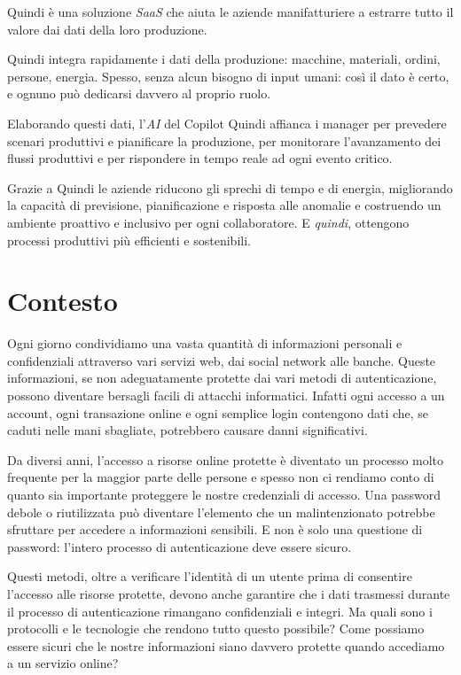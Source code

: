 Quindi è una soluzione \emph{\gls{SaaS}} che aiuta le aziende manifatturiere a estrarre tutto il valore dai dati della loro produzione.

Quindi integra rapidamente i dati della produzione: macchine, materiali, ordini, persone, energia. Spesso, senza alcun bisogno di input umani: così il dato è certo, e ognuno può dedicarsi davvero al proprio ruolo.

Elaborando questi dati, l'\emph{\gls{AI}} del Copilot Quindi affianca i manager per prevedere scenari produttivi e pianificare la produzione, per monitorare l’avanzamento dei flussi produttivi e per rispondere in tempo reale ad ogni evento critico.

Grazie a Quindi le aziende riducono gli sprechi di tempo e di energia, migliorando la capacità di previsione, pianificazione e risposta alle anomalie e costruendo un ambiente proattivo e inclusivo per ogni collaboratore. E \emph{quindi}, ottengono processi produttivi più efficienti e sostenibili.


\section{Contesto}

Ogni giorno condividiamo una vasta quantità di informazioni personali e confidenziali attraverso vari servizi web, dai social network alle banche.
Queste informazioni, se non adeguatamente protette dai vari metodi di autenticazione, possono diventare bersagli facili di attacchi informatici.
Infatti ogni accesso a un account, ogni transazione online e ogni semplice login contengono dati che, se caduti nelle mani sbagliate, potrebbero causare danni significativi.

Da diversi anni, l'accesso a risorse online protette è diventato un processo molto frequente per la maggior parte delle persone e spesso non ci rendiamo conto di quanto sia importante proteggere le nostre credenziali di accesso.
Una password debole o riutilizzata può diventare l'elemento che un malintenzionato potrebbe sfruttare per accedere a informazioni sensibili.
E non è solo una questione di password: l'intero processo di autenticazione deve essere sicuro.

Questi metodi, oltre a verificare l'identità di un utente prima di consentire l'accesso alle risorse protette, devono anche garantire che i dati trasmessi durante il processo di autenticazione rimangano confidenziali e integri.
Ma quali sono i protocolli e le tecnologie che rendono tutto questo possibile? Come possiamo essere sicuri che le nostre informazioni siano davvero protette quando accediamo a un servizio online?

